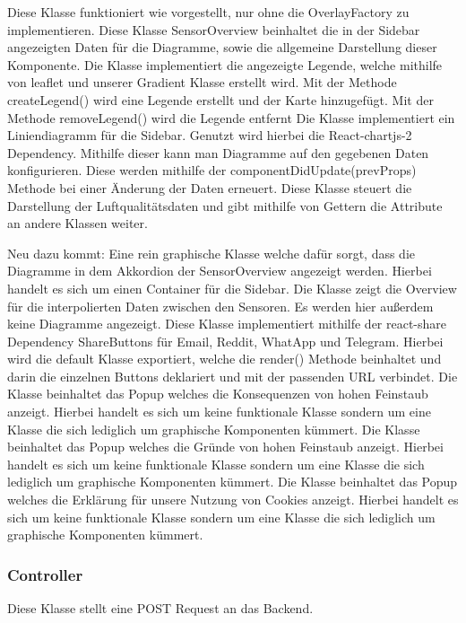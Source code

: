     Diese Klasse funktioniert wie vorgestellt, nur ohne die OverlayFactory zu implementieren.
    Diese Klasse SensorOverview beinhaltet die in der Sidebar angezeigten Daten für die Diagramme, sowie die allgemeine Darstellung dieser Komponente.
    Die Klasse implementiert die angezeigte Legende, welche mithilfe von leaflet und unserer Gradient Klasse erstellt wird.
    Mit der Methode createLegend() wird eine Legende erstellt und der Karte hinzugefügt.
    Mit der Methode removeLegend() wird die Legende entfernt
    Die Klasse implementiert ein Liniendiagramm für die Sidebar. Genutzt wird hierbei die React-chartjs-2 Dependency.
    Mithilfe dieser kann man Diagramme auf den gegebenen Daten konfigurieren. Diese werden mithilfe der componentDidUpdate(prevProps) Methode
    bei einer Änderung der Daten erneuert.
    \removedClass
{}
    \removedClass
{}
    Diese Klasse steuert die Darstellung der Luftqualitätsdaten und gibt mithilfe von Gettern die Attribute an andere Klassen weiter.

Neu dazu kommt:
    Eine rein graphische Klasse welche dafür sorgt, dass die Diagramme in dem Akkordion der SensorOverview angezeigt werden.
    Hierbei handelt es sich um einen Container für die Sidebar.
    Die Klasse zeigt die Overview für die interpolierten Daten zwischen den Sensoren. Es werden hier außerdem keine Diagramme angezeigt.
    Diese Klasse implementiert mithilfe der react-share Dependency ShareButtons für Email, Reddit, WhatApp und Telegram.
    Hierbei wird die default Klasse exportiert, welche die render() Methode beinhaltet und darin die einzelnen Buttons deklariert und 
    mit der passenden URL verbindet.
    Die Klasse beinhaltet das Popup welches die Konsequenzen von hohen Feinstaub anzeigt. Hierbei handelt es sich um keine funktionale Klasse sondern um eine Klasse die sich
    lediglich um graphische Komponenten kümmert.
    Die Klasse beinhaltet das Popup welches die Gründe von hohen Feinstaub anzeigt. Hierbei handelt es sich um keine funktionale Klasse sondern um eine Klasse die sich
    lediglich um graphische Komponenten kümmert.
    Die Klasse beinhaltet das Popup welches die Erklärung für unsere Nutzung von Cookies anzeigt. Hierbei handelt es sich um keine funktionale Klasse sondern um eine Klasse die sich
    lediglich um graphische Komponenten kümmert.

\subsubsection{Controller}
    Diese Klasse stellt eine POST Request an das Backend.